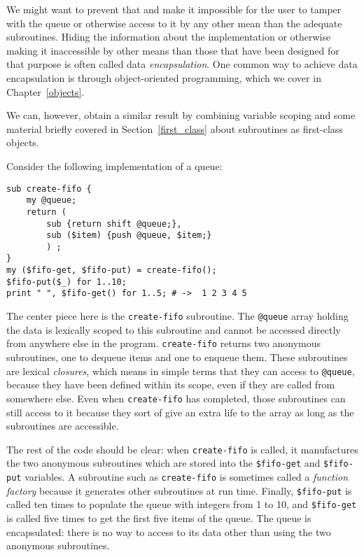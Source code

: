 We might want to prevent that and make it impossible for 
the user to tamper with the queue or otherwise access to it by 
any other mean than the adequate subroutines. Hiding the 
information about the implementation or otherwise making 
it inaccessible by other means than those that have been 
designed for that purpose is often called data 
\emph{encapsulation}. One common way to achieve data 
encapsulation is through object-oriented programming, which 
we cover in Chapter~\ref{objects}. 

We can, however, obtain 
a similar result by combining variable scoping and some 
material briefly covered in Section~\ref{first_class} about 
subroutines as first-class objects.

Consider the following implementation of a queue:
\begin{verbatim}
sub create-fifo {
    my @queue;
    return (
        sub {return shift @queue;}, 
        sub ($item) {push @queue, $item;}
        ) ;
}
my ($fifo-get, $fifo-put) = create-fifo();
$fifo-put($_) for 1..10;
print " ", $fifo-get() for 1..5; # ->  1 2 3 4 5
\end{verbatim}
%
The center piece here is the {\tt create-fifo} subroutine.
The \verb'@queue' array holding the data is lexically 
scoped to this subroutine and cannot be accessed directly 
from anywhere else in the program. {\tt create-fifo} returns 
two anonymous subroutines, one to dequeue items and one 
to enqueue them. These subroutines are lexical \emph{closures}, 
which means in simple terms that they can access to 
\verb'@queue', because they have been defined within its 
scope, even if they are called from somewhere else. Even 
when {\tt create-fifo} has completed, those subroutines 
can still access to it because they sort of give an extra 
life to the array as long as the subroutines are accessible.

The rest of the code should be clear: when {\tt create-fifo} is 
called, it manufactures the two anonymous subroutines which 
are stored into the \verb'$fifo-get' and \verb'$fifo-put' 
variables. A subroutine such as {\tt create-fifo} is 
sometimes called a \emph{function factory} because it 
generates other subroutines at run time.
Finally, \verb'$fifo-put' is called ten times to 
populate the queue with integers from 1 to 10, and 
\verb'$fifo-get' is called five times to get the first five 
items of the queue. The queue is encapsulated: there is 
no way to access to its data other than using the two 
anonymous subroutines.

